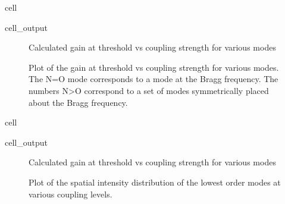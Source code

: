 \documentclass[a4paper,10pt,english,openany,oneside]{jupyterBook}
\begin{document}
\begin{sphinxuseclass}{cell}\begin{sphinxVerbatimOutput}

\begin{sphinxuseclass}{cell_output}
\begin{figure}[htbp]
\centering
\capstart

\noindent{}
\caption{Calculated gain at threshold vs coupling strength for various modes}\label{\detokenize{Kogelnik-Shank_Coupled-Wave-Theory_DFB-Lasers:kogelnik9c}}\end{figure}

\end{sphinxuseclass}\end{sphinxVerbatimOutput}

\end{sphinxuseclass}
\begin{figure}[htbp]
\centering
\capstart

\noindent{}
\caption{Plot of the gain at threshold vs coupling strength for various modes. The N=O mode corresponds to a mode at the Bragg frequency. The numbers N>O correspond to a set of modes symmetrically placed about the Bragg frequency.}\label{\detokenize{Kogelnik-Shank_Coupled-Wave-Theory_DFB-Lasers:kogelnik9}}\end{figure}

\begin{sphinxuseclass}{cell}\begin{sphinxVerbatimOutput}

\begin{sphinxuseclass}{cell_output}
\begin{figure}[htbp]
\centering
\capstart

\noindent{}
\caption{Calculated gain at threshold vs coupling strength for various modes}\label{\detokenize{Kogelnik-Shank_Coupled-Wave-Theory_DFB-Lasers:kogelnik10c}}\end{figure}

\end{sphinxuseclass}\end{sphinxVerbatimOutput}

\end{sphinxuseclass}
\begin{figure}[htbp]
\centering
\capstart

\noindent{}
\caption{Plot of the spatial intensity distribution of the lowest order modes at various coupling levels.}\label{\detokenize{Kogelnik-Shank_Coupled-Wave-Theory_DFB-Lasers:kogelnik10}}\end{figure}
\end{document}
